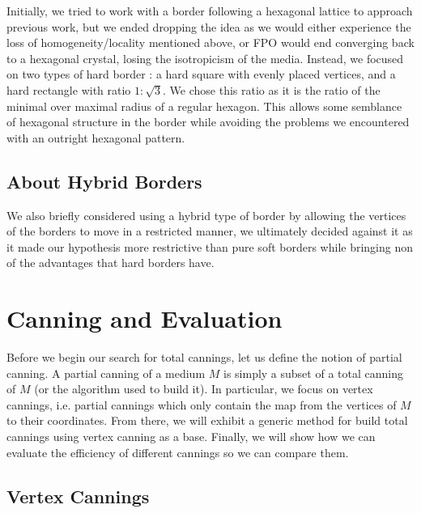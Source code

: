 \documentclass{article}
\begin{document}
Initially, we tried to work with a border following a hexagonal lattice to approach previous work, but we ended dropping the idea as we would either experience the loss of homogeneity/locality mentioned above, or FPO would end converging back to a hexagonal crystal, losing the isotropicism of the media. Instead, we focused on two types of hard border : a hard square with evenly placed vertices, and a hard rectangle with ratio $1\colon\sqrt{3}$. We chose this ratio as it is the ratio of the minimal over maximal radius of a regular hexagon. This allows some semblance of hexagonal structure in the border while avoiding the problems we encountered with an outright hexagonal pattern.

\subsection{About Hybrid Borders}

We also briefly considered using a hybrid type of border by allowing the vertices of the borders to move in a restricted manner, we ultimately decided against it as it made our hypothesis more restrictive than pure soft borders while bringing non of the advantages that hard borders have.

\section{Canning and Evaluation}

Before we begin our search for total cannings, let us define the notion of partial canning. A partial canning of a medium $M$ is simply a subset of a total canning of $M$ (or the algorithm used to build it). In particular, we focus on vertex cannings, i.e. partial cannings which only contain the map from the vertices of $M$ to their coordinates. From there, we will exhibit a generic method for build total cannings using vertex canning as a base. Finally, we will show how we can evaluate the efficiency of different cannings so we can compare them.

\subsection{Vertex Cannings}
\label{partial_canning}
\end{document}
